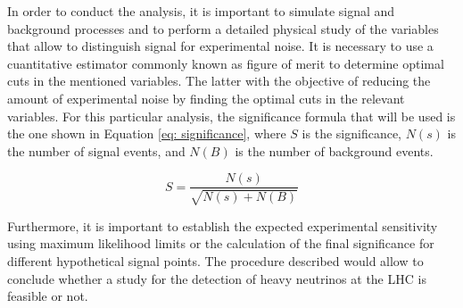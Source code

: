 



In order to conduct the analysis, it is important to simulate signal and background processes and to perform a detailed physical study of the variables that allow to distinguish signal for experimental noise. It is necessary to use a cuantitative estimator commonly known as figure of merit to determine optimal cuts in the mentioned variables. The latter with the objective of reducing the amount of experimental noise by finding the optimal cuts in the relevant variables. For this particular analysis, the significance formula that will be used is the one shown in Equation \ref{eq: significance}, where $S$ is the significance, $N(s)$ is the number of signal events, and $N(B)$ is the number of background events.

\begin{equation} \label{eq: significance}
    S = \frac{N(s)}{\sqrt{N(s) + N(B)}}
\end{equation}

Furthermore, it is important to establish the expected experimental sensitivity using maximum likelihood limits or the calculation of the final significance for different hypothetical signal points. The procedure described would allow to conclude whether a study for the detection of heavy neutrinos at the LHC is feasible or not.
